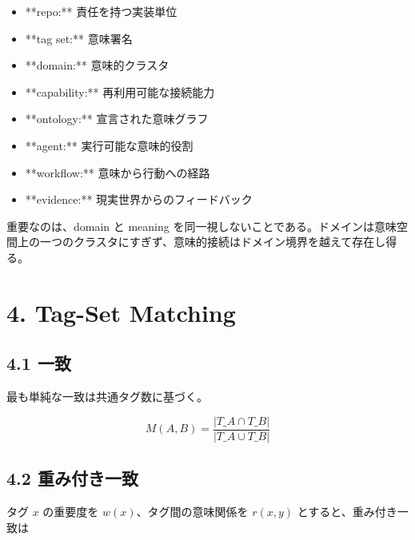 \documentclass[a4paper,11pt]{jsarticle}
\begin{document}
\begin{itemize}
\item **repo:** 責任を持つ実装単位
\end{itemize}
\begin{itemize}
\item **tag set:** 意味署名
\end{itemize}
\begin{itemize}
\item **domain:** 意味的クラスタ
\end{itemize}
\begin{itemize}
\item **capability:** 再利用可能な接続能力
\end{itemize}
\begin{itemize}
\item **ontology:** 宣言された意味グラフ
\end{itemize}
\begin{itemize}
\item **agent:** 実行可能な意味的役割
\end{itemize}
\begin{itemize}
\item **workflow:** 意味から行動への経路
\end{itemize}
\begin{itemize}
\item **evidence:** 現実世界からのフィードバック
\end{itemize}
重要なのは、domain と meaning を同一視しないことである。ドメインは意味空間上の一つのクラスタにすぎず、意味的接続はドメイン境界を越えて存在し得る。


\section{4. Tag-Set Matching}
\subsection{4.1 一致}
最も単純な一致は共通タグ数に基づく。


\[


M(A,B)=\frac{|T\_A\cap T\_B|}{|T\_A\cup T\_B|}


\]


\subsection{4.2 重み付き一致}
タグ \(x\) の重要度を \(w(x)\)、タグ間の意味関係を \(r(x,y)\) とすると、重み付き一致は
\end{document}
